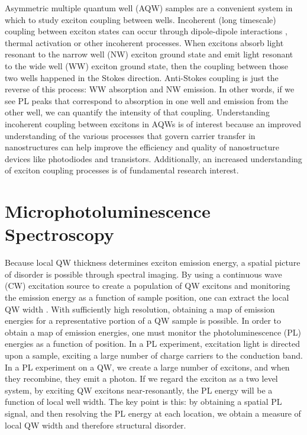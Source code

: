 \indent Asymmetric multiple quantum well (AQW) samples are a convenient system in which to study exciton coupling between wells. Incoherent (long timescale) coupling between exciton states can occur through dipole-dipole interactions \cite{tomita}, thermal activation \cite{Borri} or other incoherent processes. When excitons absorb light resonant to the narrow well (NW) exciton ground state and emit light resonant to the wide well (WW) exciton ground state, then the coupling between those two wells happened in the Stokes direction. Anti-Stokes coupling is just the reverse of this process: WW absorption and NW emission. In other words, if we see PL peaks that correspond to absorption in one well and emission from the other well, we can quantify the intensity of that coupling. Understanding incoherent coupling between excitons in AQWs is of interest because an improved understanding of the various processes that govern carrier transfer in nanostructures can help improve the efficiency and quality of nanostructure devices like photodiodes and transistors. Additionally, an increased understanding of exciton coupling processes is of fundamental research interest.



\section{Microphotoluminescence Spectroscopy}
\indent Because local QW thickness determines exciton emission energy, a spatial picture of disorder is possible through spectral imaging. By using a continuous wave (CW) excitation source to create a population of QW excitons and monitoring the emission energy as a function of sample position, one can extract the local QW width \cite{bristowsep}. With sufficiently high resolution, obtaining a map of emission energies for a representative portion of a QW sample is possible. In order to obtain a map of emission energies, one must monitor the photoluminescence (PL) energies as a function of position. In a PL experiment, excitation light is directed upon a sample, exciting a large number of charge carriers to the conduction band. In a PL experiment on a QW, we create a large number of excitons, and when they recombine, they emit a photon. If we regard the exciton as a two level system, by exciting QW excitons near-resonantly, the PL energy will be a function of local well width. The key point is this: by obtaining a spatial PL signal, and then resolving the PL energy at each location, we obtain a measure of local QW width and therefore structural disorder.

